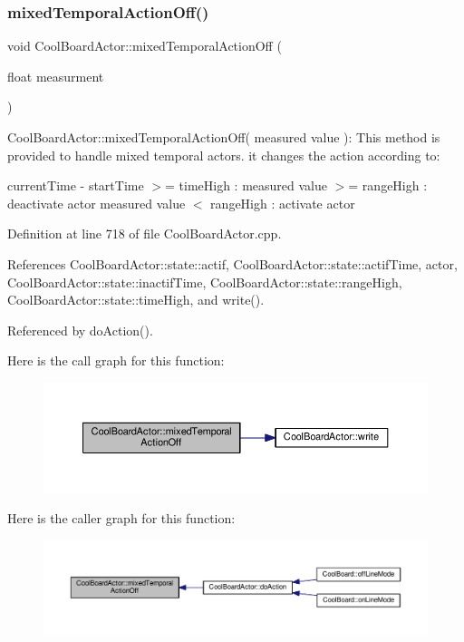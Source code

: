 \subsubsection{\texorpdfstring{mixed\+Temporal\+Action\+Off()}{mixedTemporalActionOff()}}
{\footnotesize\ttfamily void Cool\+Board\+Actor\+::mixed\+Temporal\+Action\+Off (\begin{DoxyParamCaption}\item[{float}]{measurment }\end{DoxyParamCaption})}

Cool\+Board\+Actor\+::mixed\+Temporal\+Action\+Off( measured value )\+: This method is provided to handle mixed temporal actors. it changes the action according to\+:

current\+Time -\/ start\+Time $>$= time\+High \+: measured value $>$= range\+High \+: deactivate actor measured value $<$ range\+High \+: activate actor 

Definition at line 718 of file Cool\+Board\+Actor.\+cpp.



References Cool\+Board\+Actor\+::state\+::actif, Cool\+Board\+Actor\+::state\+::actif\+Time, actor, Cool\+Board\+Actor\+::state\+::inactif\+Time, Cool\+Board\+Actor\+::state\+::range\+High, Cool\+Board\+Actor\+::state\+::time\+High, and write().



Referenced by do\+Action().

Here is the call graph for this function\+:\nopagebreak
\begin{figure}[H]
\begin{center}
\leavevmode
\includegraphics[width=350pt]{dc/d69/class_cool_board_actor_a00b29c4abf0388551aa6812372113cf1_cgraph}
\end{center}
\end{figure}
Here is the caller graph for this function\+:\nopagebreak
\begin{figure}[H]
\begin{center}
\leavevmode
\includegraphics[width=350pt]{dc/d69/class_cool_board_actor_a00b29c4abf0388551aa6812372113cf1_icgraph}
\end{center}
\end{figure}
\mbox{\label{class_cool_board_actor_a216aa7a0cfd1f31d0025cc91c2ecd5dd}} 
